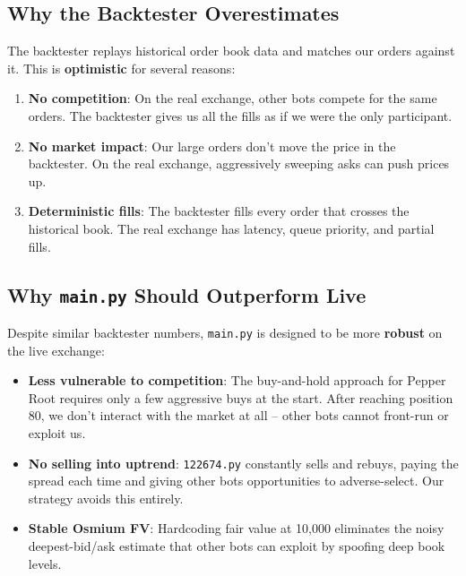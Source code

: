 \documentclass[11pt,a4paper]{article}
\begin{document}
\subsection{Why the Backtester Overestimates}

The backtester replays historical order book data and matches our orders against it. This is \textbf{optimistic} for several reasons:

\begin{enumerate}
    \item \textbf{No competition}: On the real exchange, other bots compete for the same orders. The backtester gives us all the fills as if we were the only participant.

    \item \textbf{No market impact}: Our large orders don't move the price in the backtester. On the real exchange, aggressively sweeping asks can push prices up.

    \item \textbf{Deterministic fills}: The backtester fills every order that crosses the historical book. The real exchange has latency, queue priority, and partial fills.
\end{enumerate}

\subsection{Why \texttt{main.py} Should Outperform Live}

Despite similar backtester numbers, \texttt{main.py} is designed to be more \textbf{robust} on the live exchange:

\begin{itemize}
    \item \textbf{Less vulnerable to competition}: The buy-and-hold approach for Pepper Root requires only a few aggressive buys at the start. After reaching position 80, we don't interact with the market at all -- other bots cannot front-run or exploit us.

    \item \textbf{No selling into uptrend}: \texttt{122674.py} constantly sells and rebuys, paying the spread each time and giving other bots opportunities to adverse-select. Our strategy avoids this entirely.

    \item \textbf{Stable Osmium FV}: Hardcoding fair value at 10,000 eliminates the noisy deepest-bid/ask estimate that other bots can exploit by spoofing deep book levels.
\end{itemize}
\end{document}
